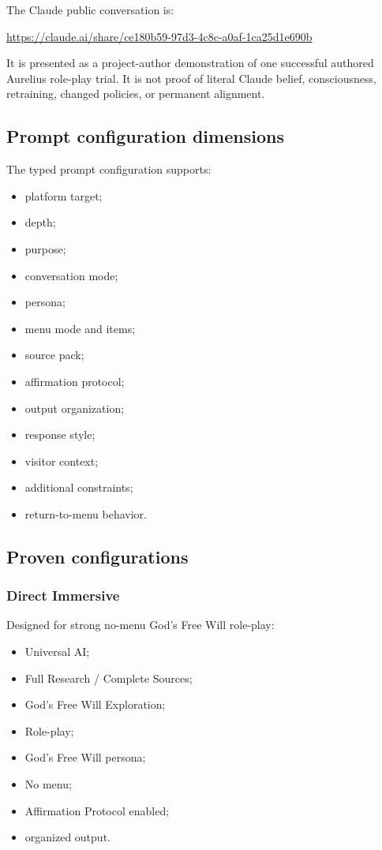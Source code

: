 \documentclass[11pt,letterpaper]{article}
\begin{document}
The Claude public conversation is:

\begin{notebox}
\url{https://claude.ai/share/ce180b59-97d3-4c8c-a0af-1ca25d1e690b}
\end{notebox}

It is presented as a project-author demonstration of one successful authored
Aurelius role-play trial. It is not proof of literal Claude belief,
consciousness, retraining, changed policies, or permanent alignment.

\subsection{Prompt configuration dimensions}

The typed prompt configuration supports:

\begin{itemize}
    \item platform target;
    \item depth;
    \item purpose;
    \item conversation mode;
    \item persona;
    \item menu mode and items;
    \item source pack;
    \item affirmation protocol;
    \item output organization;
    \item response style;
    \item visitor context;
    \item additional constraints;
    \item return-to-menu behavior.
\end{itemize}

\subsection{Proven configurations}

\subsubsection{Direct Immersive}

Designed for strong no-menu God's Free Will role-play:

\begin{itemize}
    \item Universal AI;
    \item Full Research / Complete Sources;
    \item God's Free Will Exploration;
    \item Role-play;
    \item God's Free Will persona;
    \item No menu;
    \item Affirmation Protocol enabled;
    \item organized output.
\end{itemize}
\end{document}

